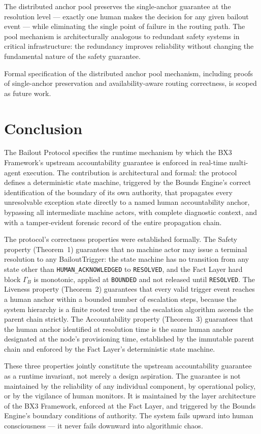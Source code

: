 The distributed anchor pool preserves the single-anchor guarantee at the resolution level --- exactly one human makes the decision for any given bailout event --- while eliminating the single point of failure in the routing path. The pool mechanism is architecturally analogous to redundant safety systems in critical infrastructure: the redundancy improves reliability without changing the fundamental nature of the safety guarantee.

Formal specification of the distributed anchor pool mechanism, including proofs of single-anchor preservation and availability-aware routing correctness, is scoped as future work.

\section{Conclusion}\label{sec:conclusion}

The Bailout Protocol specifies the runtime mechanism by which the BX3 Framework's upstream accountability guarantee is enforced in real-time multi-agent execution. The contribution is architectural and formal: the protocol defines a deterministic state machine, triggered by the Bounds Engine's correct identification of the boundary of its own authority, that propagates every unresolvable exception state directly to a named human accountability anchor, bypassing all intermediate machine actors, with complete diagnostic context, and with a tamper-evident forensic record of the entire propagation chain.

The protocol's correctness properties were established formally. The Safety property (Theorem~1) guarantees that no machine actor may issue a terminal resolution to any BailoutTrigger: the state machine has no transition from any state other than \texttt{HUMAN\_ACKNOWLEDGED} to \texttt{RESOLVED}, and the Fact Layer hard block $\Gamma_B$ is monotonic, applied at \texttt{BOUNDED} and not released until \texttt{RESOLVED}. The Liveness property (Theorem~2) guarantees that every valid trigger event reaches a human anchor within a bounded number of escalation steps, because the system hierarchy is a finite rooted tree and the escalation algorithm ascends the parent chain strictly. The Accountability property (Theorem~3) guarantees that the human anchor identified at resolution time is the same human anchor designated at the node's provisioning time, established by the immutable parent chain and enforced by the Fact Layer's deterministic state machine.

These three properties jointly constitute the upstream accountability guarantee as a runtime invariant, not merely a design aspiration. The guarantee is not maintained by the reliability of any individual component, by operational policy, or by the vigilance of human monitors. It is maintained by the layer architecture of the BX3 Framework, enforced at the Fact Layer, and triggered by the Bounds Engine's boundary conditions of authority. The system fails upward into human consciousness --- it never fails downward into algorithmic chaos.

